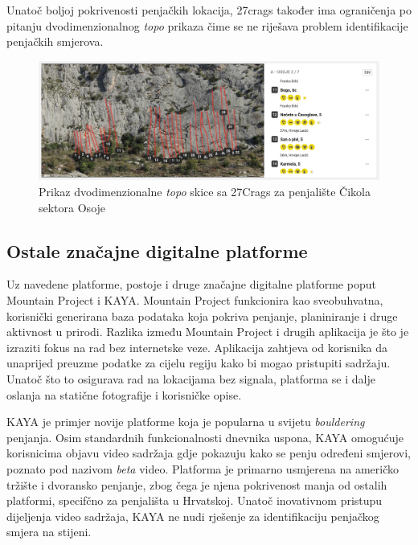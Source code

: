 Unatoč boljoj pokrivenosti penjačkih lokacija, 27crags također ima ograničenja po pitanju dvodimenzionalnog \textit{topo} prikaza čime se ne riješava problem identifikacije penjačkih smjerova.

\begin{figure}[H]
    \centering
    \includegraphics[width=1\textwidth]{images/analiza/cikola_27crags_topo.jpeg}
    \caption{Prikaz dvodimenzionalne \textit{topo} skice sa 27Crags za penjalište Čikola sektora Osoje}
    \label{fig:cikola_27crags_topo}
\end{figure}

\subsection{Ostale značajne digitalne platforme}

Uz navedene platforme, postoje i druge značajne digitalne platforme poput Mountain Project i KAYA. Mountain Project funkcionira kao sveobuhvatna, korisnički generirana baza podataka koja pokriva penjanje, planiniranje i druge aktivnost u prirodi. Razlika između Mountain Project i drugih aplikacija je što je izraziti fokus na rad bez internetske veze. Aplikacija zahtjeva od korisnika da unaprijed preuzme podatke za cijelu regiju kako bi mogao pristupiti sadržaju. Unatoč što to osigurava rad na lokacijama bez signala, platforma se i dalje oslanja na statične fotografije i korisničke opise.

KAYA je primjer novije platforme koja je popularna u svijetu \textit{bouldering} penjanja. Osim standardnih funkcionalnosti dnevnika uspona, KAYA omogućuje korisnicima objavu video sadržaja gdje pokazuju kako se penju određeni smjerovi, poznato pod nazivom \textit{beta} video.  Platforma je primarno usmjerena na američko tržište i dvoransko penjanje, zbog čega je njena pokrivenost manja od ostalih platformi, specifčno za penjališta u Hrvatskoj. Unatoč inovativnom pristupu dijeljenja video sadržaja, KAYA ne nudi rješenje za identifikaciju penjačkog smjera na stijeni.


